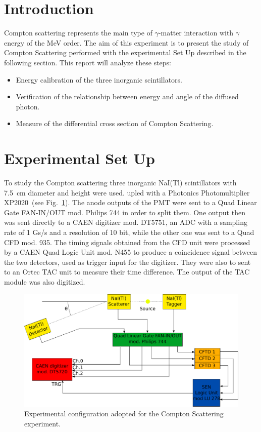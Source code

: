\section*{Introduction}

Compton scattering represents the main  type of $\gamma$-matter interaction with $\gamma$ energy of the MeV order.   
The aim of this experiment is to present the study of Compton Scattering performed with the experimental Set Up described in the following section.
This report will analyze these steps:
\begin{itemize}
	\item Energy calibration of the three inorganic scintillators.
	\item Verification of the relationship between energy and angle of the diffused photon.
	\item Measure of the differential cross section of Compton Scattering.
\end{itemize}

\section*{Experimental Set Up}

To study the Compton scattering three inorganic NaI(Tl) scintillators with 7.5~cm diameter and height were used.  upled with a Photonics Photomultiplier XP2020~(see Fig.~\ref{fig:Set_up}). The anode outputs of the PMT were sent to a Quad Linear Gate FAN-IN/OUT mod. Philips 744 in order to split them. One output then was sent directly to a CAEN digitizer mod. DT5751, an ADC with a sampling rate of 1 Gs/s and a resolution of 10 bit, while the other one was sent to a Quad CFD mod. 935. The timing signals obtained from the CFD unit were processed by a CAEN Quad Logic Unit mod. N455 to produce a coincidence signal between the two detectors, used as trigger input for the digitizer. They were also to sent to an Ortec TAC unit to measure their time difference. The output of the TAC module was also digitized.

\begin{figure}[h!]
	\centering
	\includegraphics[width=\textwidth]{immagini/SetUp.pdf}
	\caption{Experimental configuration adopted for the Compton Scattering experiment.}
	\label{fig:Set_up}
\end{figure}